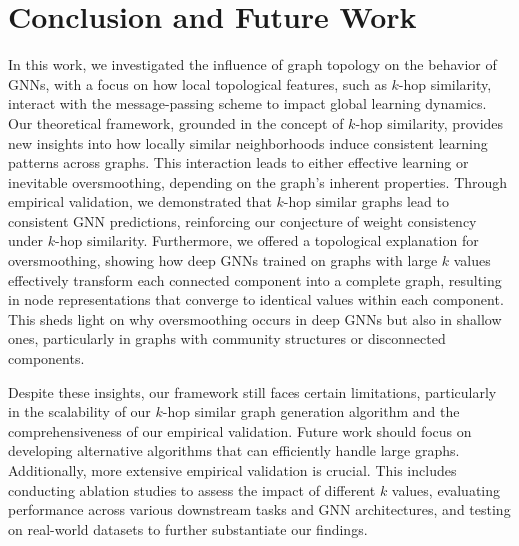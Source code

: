 \section{Conclusion and Future Work}
In this work, we investigated the influence of graph topology on the behavior of GNNs, with a focus on how local topological features, such as $k$-hop similarity, interact with the message-passing scheme to impact global learning dynamics. Our theoretical framework, grounded in the concept of $k$-hop similarity, provides new insights into how locally similar neighborhoods induce consistent learning patterns across graphs. This interaction leads to either effective learning or inevitable oversmoothing, depending on the graph's inherent properties. Through empirical validation, we demonstrated that $k$-hop similar graphs lead to consistent GNN predictions, reinforcing our conjecture of weight consistency under $k$-hop similarity. Furthermore, we offered a topological explanation for oversmoothing, showing how deep GNNs trained on graphs with large $k$ values effectively transform each connected component into a complete graph, resulting in node representations that converge to identical values within each component. This sheds light on why oversmoothing occurs in deep GNNs but also in shallow ones, particularly in graphs with community structures or disconnected components.

Despite these insights, our framework still faces certain limitations, particularly in the scalability of our $k$-hop similar graph generation algorithm and the comprehensiveness of our empirical validation. Future work should focus on developing alternative algorithms that can efficiently handle large graphs. Additionally, more extensive empirical validation is crucial. This includes conducting ablation studies to assess the impact of different $k$ values, evaluating performance across various downstream tasks and GNN architectures, and testing on real-world datasets to further substantiate our findings.